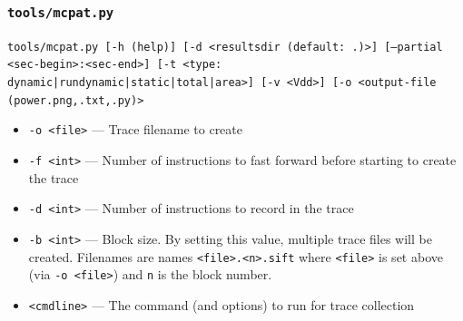 \documentclass[a4paper,11pt,titlepage]{article}
\newcommand{\cmd}[1]{{\tt #1}}
\newcommand{\opt}[1]{{\tt #1}}
\begin{document}
\subsubsection{\cmd{tools/mcpat.py}}

\cmd{tools/mcpat.py [-h (help)] [-d <resultsdir (default: .)>] [--partial <sec-begin>:<sec-end>] [-t <type: dynamic|rundynamic|static|total|area>] [-v <Vdd>] [-o <output-file (power{.png,.txt,.py})>}

\begin{itemize}[label=$$]
\item \opt{-d <dir>} --- Look into \opt{<dir>} to find the necessary files to compute a power stack
\item \opt{--partial} --- Compute power over time span between specific statistics markers (default: \opt{roi-begin:roi-end})
\item \opt{-o <file>} --- Save gnuplot plotted data to <file>.png
\item \opt{-t <type>} --- Output type of McPAT to plot: dynamic (dynamic power), rundynamic (runtime dynamic), static, total (dynamic + static), area
\item \opt{-v <vdd>} --- Override the process' default Vdd (V)
\end{itemize}


\subsection{SIFT Utilities}

\subsubsection{\cmd{record-trace}}

Record a SIFT instruction trace.

\cmd{./record-trace  -o <output file (default=trace)>  [-f <fast-forward instrs (default=none)] [-d <detailed instrs (default=all)] [-b <block size (instructions, default=all)> [--gdb|--gdb-wait|--gdb-quit] -- <cmdline>}

\begin{itemize}[label=$$]
\item \opt{-o <file>} --- Trace filename to create
\item \opt{-f <int>} --- Number of instructions to fast forward before starting to create the trace
\item \opt{-d <int>} --- Number of instructions to record in the trace
\item \opt{-b <int>} --- Block size.  By setting this value, multiple trace files will be created.  Filenames are names \cmd{<file>.<n>.sift} where \cmd{<file>} is set above (via \cmd{-o <file>}) and \cmd{n} is the block number.
\item \opt{<cmdline>} --- The command (and options) to run for trace collection
\end{itemize}
\end{document}
